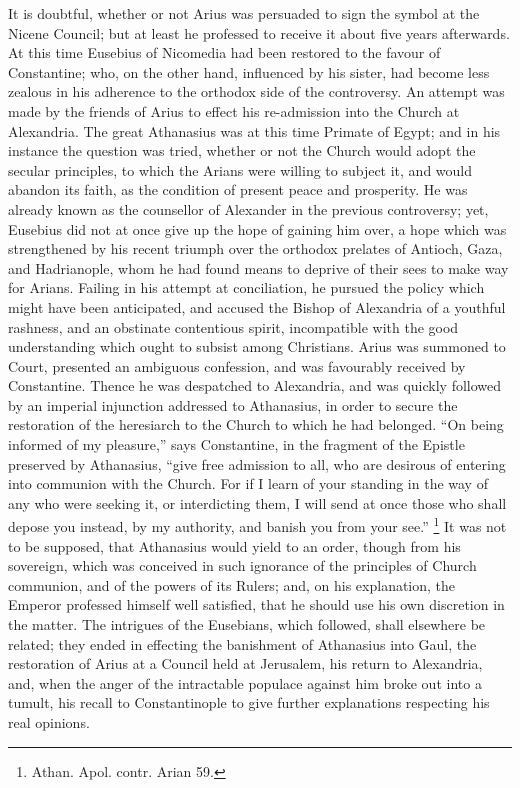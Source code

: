 It is doubtful, whether or not Arius was persuaded to sign the
symbol at the Nicene Council; but at least he professed to receive it
about five years afterwards. At this time Eusebius of Nicomedia had
been restored to the favour of Constantine; who, on the other hand,
influenced by his sister, had become less zealous in his adherence to
the orthodox side of the controversy. An attempt was made by the
friends of Arius to effect his re-admission into the Church at
Alexandria. The great Athanasius was at this time Primate of Egypt;
and in his instance the question was tried, whether or not the Church
would adopt the secular principles, to which the Arians were willing
to subject it, and would abandon its faith, as the condition of
present peace and prosperity. He was already known as the counsellor
of Alexander in the previous controversy; yet, Eusebius did not at
once give up the hope of gaining him over, a hope which was
strengthened by his recent triumph over the orthodox prelates of
Antioch, Gaza, and Hadrianople, whom he had found means to deprive of
their sees to make way for Arians. Failing in his attempt at
conciliation, he pursued the policy which might have been anticipated,
and accused the Bishop of Alexandria of a youthful rashness, and an
obstinate contentious spirit, incompatible with the good understanding
which ought to subsist among Christians. Arius was summoned to Court,
presented an ambiguous confession, and was favourably received by
Constantine. Thence he was despatched to Alexandria, and was quickly
followed by an imperial injunction addressed to Athanasius, in order
to secure the restoration of the heresiarch to the Church to which he
had belonged. ``On being informed of my pleasure,'' says
Constantine, in the fragment of the Epistle preserved by Athanasius,
``give free admission to all, who are desirous of entering into
communion with the Church. For if I learn of your standing in the way
of any who were seeking it, or interdicting them, I will send at once
those who shall depose you instead, by my authority, and banish you
from your see.'' \footnote{Athan. Apol. contr. Arian 59.} It
was not to be supposed, that Athanasius would yield to an order,
though from his sovereign, which was conceived in such ignorance of
the principles of Church communion, and of the powers of its Rulers;
and, on his explanation, the Emperor professed himself well satisfied,
that he should use his own discretion in the matter. The intrigues of
the Eusebians, which followed, shall elsewhere be related; they ended
in effecting the banishment of Athanasius into Gaul, the restoration
of Arius at a Council held at Jerusalem, his return to
Alexandria, and, when the anger of the intractable populace against
him broke out into a tumult, his recall to Constantinople to give
further explanations respecting his real opinions.

